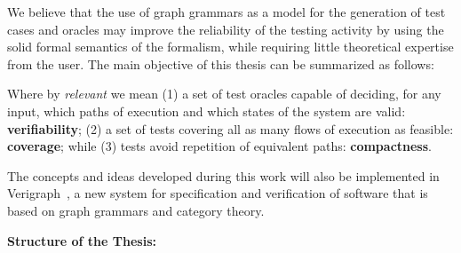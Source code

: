 We believe that the use of graph grammars as a model for the generation of test cases and oracles may improve the reliability of the testing activity by using the solid formal semantics of the formalism, while requiring little theoretical expertise from the user. The main objective of this thesis can be summarized as follows:

\begin{intuition}
\end{intuition}\hfill\break

Where by \emph{relevant} we mean (1) a set of test oracles capable of deciding, for any input, which paths of execution and which states of the system are valid: \textbf{verifiability}; (2) a set of tests covering all as many flows of execution as feasible: \textbf{coverage}; while (3) tests avoid repetition of equivalent paths: \textbf{compactness}.

The concepts and ideas developed during this work will also be implemented in Verigraph~\cite{verigraph,Costa2016}, a new system for specification and verification of software that is based on graph grammars and category theory.



\hfill \break
\textbf{Structure of the Thesis:}

